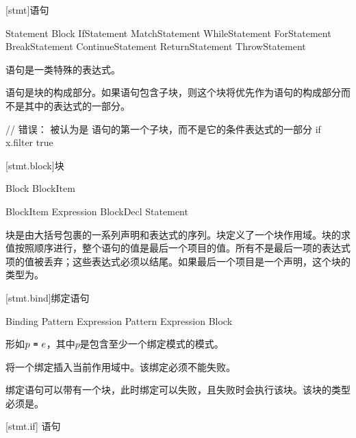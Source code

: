 
[stmt]{语句}

\begin{bnf}{Statement}
    Block \br
    IfStatement \br
    MatchStatement \br
    WhileStatement \br
    ForStatement \br
    BreakStatement \br
    ContinueStatement \br
    ReturnStatement \br
    ThrowStatement
\end{bnf}

\pnum
语句是一类特殊的表达式。

\pnum
语句是块的构成部分。如果语句包含子块，则这个块将优先作为语句的构成部分而不是其中的表达式的一部分。\enterexample

\begin{codeblock}
// 错误：  被认为是  语句的第一个子块，而不是它的条件表达式的一部分
if x.filter{ true }
\end{codeblock}

\exitexample

[stmt.block]{块}

\begin{bnf}{Block}
    \terminal{\{} BlockItem\bnfs\ \terminal{\}}
\end{bnf}

\begin{bnf}{BlockItem}
    Expression \terminal{;}\bnfq \br
    BlockDecl \br
    Statement
\end{bnf}

\pnum
块是由大括号包裹的一系列声明和表达式的序列。块定义了一个块作用域。块的求值按照顺序进行，整个语句的值是最后一个项目的值。所有不是最后一项的表达式项的值被丢弃；这些表达式必须以\tcode{;}结尾。如果最后一个项目是一个声明，这个块的类型为。

[stmt.bind]{绑定语句}

\begin{bnf}{Binding}
    Pattern \terminal{=} Expression \terminal{;} \br
    Pattern \terminal{=} Expression  Block
\end{bnf}

\pnum
{}形如$p\ \tcode{=}\ e$，其中$p$是包含至少一个绑定模式的模式。

\pnum
{}将一个绑定插入当前作用域中。该绑定必须不能失败。

\pnum
绑定语句可以带有一个块，此时绑定可以失败，且失败时会执行该块。该块的类型必须是。

[stmt.if]{ 语句}

